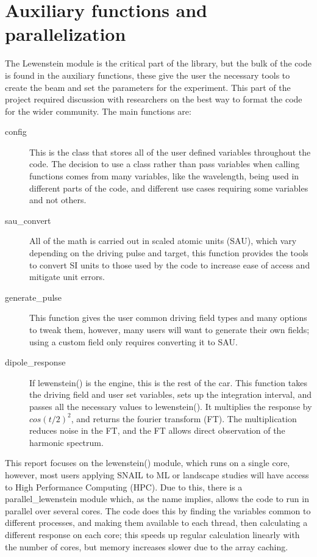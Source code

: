 \documentclass[11pt,a4paper]{report}
\begin{document}
\section{Auxiliary functions and parallelization}
The Lewenstein module is the critical part of the library, but the bulk of the code is found in the auxiliary functions, these give the user the necessary tools to create the beam and set the parameters for the experiment. This part of the project required discussion with researchers on the best way to format the code for the wider community. The main functions are:
\begin{description}
\item[config] This is the class that stores all of the user defined variables throughout the code. The decision to use a class rather than pass variables when calling functions comes from many variables, like the wavelength, being used in different parts of the code, and different use cases requiring some variables and not others.
\item[sau\_convert] All of the math is carried out in scaled atomic units (SAU), which vary depending on the driving pulse and target, this function provides the tools to convert SI units to those used by the code to increase ease of access and mitigate unit errors.
\item[generate\_pulse] This function gives the user common driving field types and many options to tweak them, however, many users will want to generate their own fields; using a custom field only requires converting it to SAU.
\item[dipole\_response] If lewenstein() is the engine, this is the rest of the car. This function takes the driving field and user set variables, sets up the integration interval, and passes all the necessary values to lewenstein(). It multiplies the response by $cos(t/2)^2$, and returns the fourier transform (FT). The multiplication reduces noise in the FT, and the FT allows direct observation of the harmonic spectrum.
\end{description}

This report focuses on the lewenstein() module, which runs on a single core, however, most users applying SNAIL to ML or landscape studies will have access to High Performance Computing (HPC). Due to this, there is a parallel\_lewenstein module which, as the name implies, allows the code to run in parallel over several cores. The code does this by finding the variables common to different processes, and making them available to each thread, then calculating a different response on each core; this speeds up regular calculation linearly with the number of cores, but memory increases slower due to the array caching.
\end{document}
